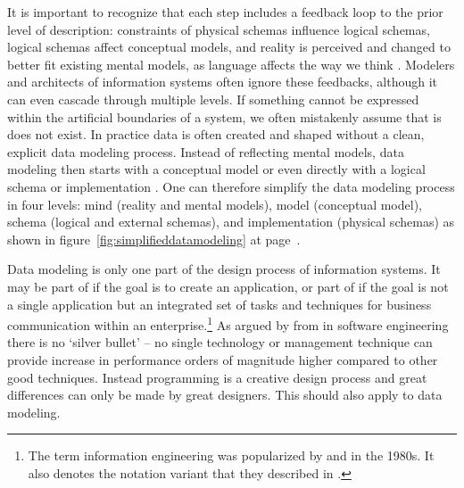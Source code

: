 It is important to recognize that each step includes a feedback loop to the
prior level of description: constraints of physical schemas influence logical
schemas, logical schemas affect conceptual models, and reality is perceived and
changed to better fit existing mental models, as language affects the way we
think \cite{Whorf1956}. Modelers and architects of information systems often
ignore these feedbacks, although it can even cascade through multiple levels. If
something cannot be expressed  within the artificial boundaries of a system, 
we often mistakenly assume that is does not exist. In practice data is often
created and shaped without a clean, explicit data modeling process. Instead of
reflecting mental models, data modeling then starts with a conceptual model or
even directly with a logical schema or implementation \cite{Simsion2007}.
One can therefore simplify the data modeling process in four levels:
mind (reality and mental models), model (conceptual model), schema (logical
and external schemas), and implementation (physical schemas) as shown in
figure~\ref{fig:simplifieddatamodeling} at page~\pageref{fig:simplifieddatamodeling}.

Data modeling is only one part of the design process of information systems.
It may be part of  if the goal is to create an
application, or part of  if the goal is not
a single application but an integrated set of tasks and techniques for
business communication within an enterprise.\footnote{The term
information engineering was popularized by  and
 in the 1980s. It also denotes the
 notation variant that they described in \cite{Martin1990}.}
As argued by \textcite{Brooks1987} from in software engineering there is
no `silver bullet' -- no single technology or management technique
can provide increase in performance orders of magnitude higher
compared to other good techniques. Instead programming is a creative 
design process and great differences can only be made by great 
designers. This should also apply to data modeling.

\label{sec:ormbasicexample}

